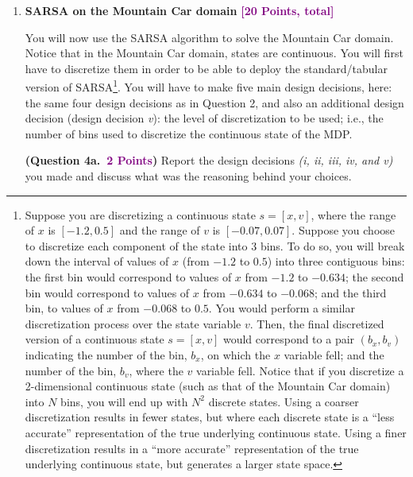 \documentclass{article}
\newcommand{\POINTS}[1]{\textcolor{purple}{\textbf{{#1}}}}
\begin{document}
\begin{enumerate}
    
    
    \vspace{1.cm}
    \item {\Large{\textbf{SARSA on the Mountain Car domain} \POINTS{[20 Points, total]}}} 
    
    You will now use the SARSA algorithm to solve the Mountain Car domain. Notice that in the Mountain Car domain, states are continuous. You will first have to discretize them in order to be able to deploy the standard/tabular version of SARSA\footnote{Suppose you are discretizing a continuous state $s=[x,v]$, where the range of $x$ is $[-1.2, 0.5]$ and the range of $v$ is $[-0.07, 0.07]$. Suppose you choose to discretize each component of the state into 3 bins. To do so, you will break down the interval of values of $x$ (from $-1.2$ to $0.5$) into three contiguous bins: the first bin would correspond to values of $x$ from $-1.2$ to $-0.634$; the second bin would correspond to values of $x$ from $-0.634$ to $-0.068$; and the third bin, to values of $x$ from $-0.068$ to $0.5$. You would perform a similar discretization process over the state variable $v$. Then, the final  discretized version of a continuous state $s=[x,v]$ would correspond to a pair $(b_x, b_v)$ indicating the number of the bin, $b_x$, on which the $x$ variable fell; and the number of the bin, $b_v$, where the $v$ variable fell. Notice that if you discretize a 2-dimensional continuous state (such as that of the Mountain Car domain) into $N$ bins, you will end up with $N^2$ discrete states. Using a coarser discretization results in fewer states, but where each discrete state is a ``less accurate'' representation of the true underlying continuous state. Using a finer discretization results in a ``more accurate'' representation of the true underlying continuous state, but generates a larger state space.}. You will have to make five main design decisions, here: the same four design decisions as in Question 2, and also an additional design decision (design decision \textit{v}): the level of discretization to be used; i.e., the number of bins used to discretize the continuous state of the MDP.
    \vspace{0.3cm}
    
        \textbf{(Question 4a.~\POINTS{2 Points})} Report the design decisions \textit{(i, ii, iii, iv, and v)} you made and discuss what was the reasoning behind your choices.
        

\end{enumerate}
\end{document}
